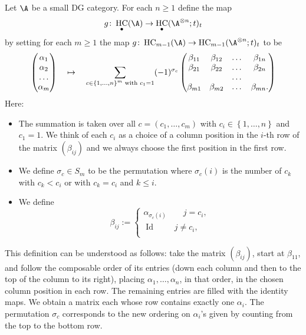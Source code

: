 \documentclass[12pt,a4paper,reqno]{amsart}
\DeclareMathOperator{\id}{Id}
\DeclareMathOperator{\hochcx}{{HC}}
\begin{document}
\begin{defn}
\label{defn-the-map-g}
Let $\A$ be a small DG category. For each $n \geq 1$ define the map 
$$ g \colon 
\hochcx_\bullet(\A)
\rightarrow 
\hochcx_\bullet(\A^{\otimes n};t)_t
$$
by setting for each $m \geq 1$ the map 
$g \colon 
\hochcx_{m-1}(\A)
\rightarrow 
\hochcx_{m-1}(\A^{\otimes n};t)_t$
to be
\begin{equation}
\label{eqn-quasi-iso-g-long-cycle}
\begin{pmatrix}
\alpha_{1} \\
\alpha_{2} \\
\dots
\\
\alpha_{m} 
\end{pmatrix}
\quad \mapsto \quad 
\sum_{c \in \left\{1,\dots,n\right\}^{m}
\\
\text{ with } c_1 = 1
}
(-1)^{\sigma_{c}}
\begin{pmatrix}
\beta_{11} & \beta_{12} & \dots & \beta_{1n}  
\\
\beta_{21} & \beta_{22} & \dots & \beta_{2n}  
\\
& & \dots & 
\\
\beta_{m1} & \beta_{m2} & \dots & \beta_{mn}.
\end{pmatrix}
\end{equation}
Here: 
\begin{itemize}
\item The summation is taken over all $c = (c_1, \dots, c_m)$ with 
$c_i \in \left\{1, \dots, n\right\}$ and $c_1 = 1$.
We think of each $c_i$ as a choice of a column position in the $i$-th row 
of the matrix $(\beta_{ij})$ and we always choose 
the first position in the first row.
\item We define $\sigma_c \in S_m$ to be 
the permutation where $\sigma_c(i)$ is 
the number of $c_k$ with $c_k < c_i$ or with
$c_k = c_i$ and $k \leq i$. 
\item We define
\begin{equation*}
\beta_{ij} := 
\begin{cases}
\alpha_{\sigma_c(i)} \quad \quad j = c_i, \\ 
\id \quad \quad \; j \neq c_i, \\ 
\end{cases}
\end{equation*}
\end{itemize}
\end{defn}

This definition can be understood as follows: take the matrix
$(\beta_{ij})$, start at $\beta_{11}$, and follow the composable
order of its entries (down each column and then to the top of 
the column to its right), placing $\alpha_1, \dots, \alpha_n$, 
in that order, in the chosen column position in each row. The remaining
entries are filled with the identity maps. We obtain a matrix 
each whose row contains exactly one $\alpha_i$. 
The permutation $\sigma_{c}$ corresponds to the 
new ordering on $\alpha_i$'s given by counting from the top to the bottom row.
\end{document}
